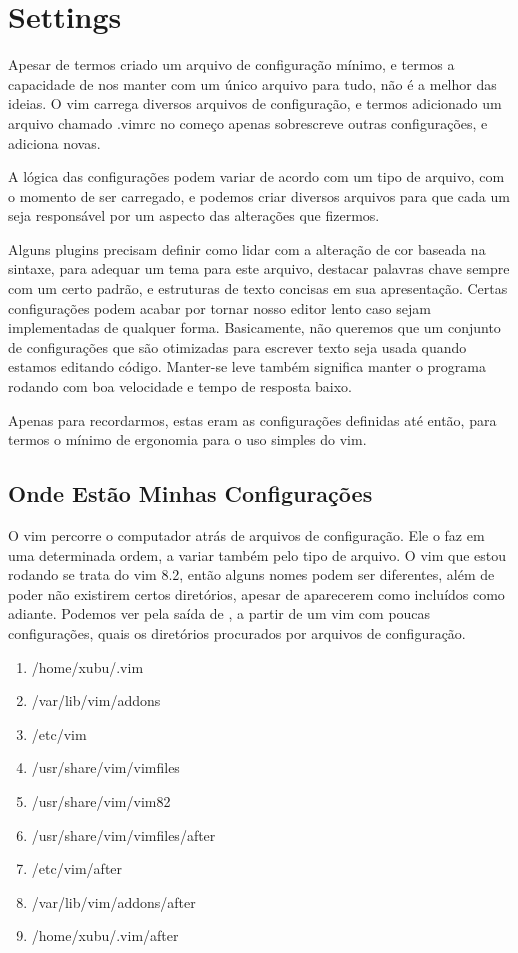 \chapter{Settings}
Apesar de termos criado um arquivo de configuração mínimo,
e termos a capacidade de nos manter com um único arquivo para tudo, não é a melhor das ideias.
O vim carrega diversos arquivos de configuração, e termos adicionado um arquivo chamado .vimrc no começo apenas
sobrescreve outras configurações, e adiciona novas.

A lógica das configurações podem variar de acordo com um tipo de arquivo,
com o momento de ser carregado, e podemos criar diversos arquivos para que cada
um seja responsável por um aspecto das alterações que fizermos.

Alguns plugins precisam definir como lidar com a alteração de cor baseada na sintaxe,
para adequar um tema para este arquivo, destacar palavras chave sempre com um certo padrão,
e estruturas de texto concisas em sua apresentação.
Certas configurações podem acabar por tornar nosso editor lento caso sejam implementadas de qualquer forma.
Basicamente, não queremos que um conjunto de configurações que são otimizadas para escrever texto seja usada 
quando estamos editando código.
Manter-se leve também significa manter o programa rodando com boa velocidade e tempo de resposta baixo.

Apenas para recordarmos, estas eram as configurações definidas até então, para termos o mínimo de ergonomia para o uso simples do vim.



\section{Onde Estão Minhas Configurações}
O vim percorre o computador atrás de arquivos de configuração.
Ele o faz em uma determinada ordem, a variar também pelo tipo de arquivo.
O vim que estou rodando se trata do vim 8.2, então alguns nomes podem ser diferentes,
além de poder não existirem certos diretórios, apesar de aparecerem como incluídos como adiante.
Podemos ver pela saída de , a partir de um vim com poucas configurações,
quais os diretórios procurados por arquivos de configuração.
\begin{multicols}{2}
\begin{enumerate}
	\item /home/xubu/.vim
	\item /var/lib/vim/addons
	\item /etc/vim
	\item /usr/share/vim/vimfiles
	\item /usr/share/vim/vim82
	\item /usr/share/vim/vimfiles/after
	\item /etc/vim/after
	\item /var/lib/vim/addons/after
	\item /home/xubu/.vim/after
\end{enumerate}
\end{multicols}

